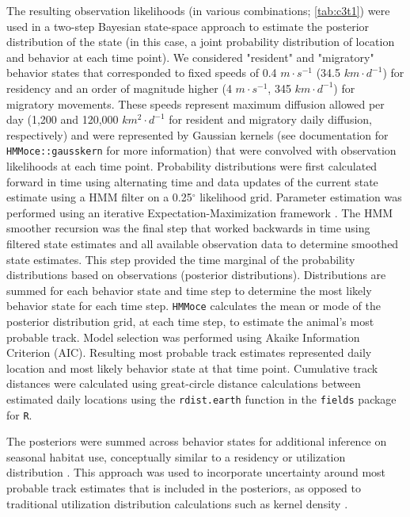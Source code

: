 The resulting observation likelihoods (in various combinations; \cref{tab:c3t1}) were used in a two-step Bayesian state-space approach to estimate the posterior distribution of the state (in this case, a joint probability distribution of location and behavior at each time point). We considered "resident" and "migratory" behavior states that corresponded to fixed speeds of 0.4 $m \cdot s^{-1}$ (34.5 $km  \cdot d^{-1}$) for residency \citep[following][]{Curtis2014} and an order of magnitude higher (4 $m \cdot s^{-1}$, 345 $km \cdot d^{-1}$) for migratory movements. These speeds represent maximum diffusion allowed per day (1,200 and 120,000 $km^2 \cdot d^{-1}$ for resident and migratory daily diffusion, respectively) and were represented by Gaussian kernels (see documentation for \texttt{HMMoce::gausskern} for more information) that were convolved with observation likelihoods at each time point. Probability distributions were first calculated forward in time using alternating time and data updates of the current state estimate using a HMM filter on a 0.25$^{\circ}$ likelihood grid. Parameter estimation was performed using an iterative Expectation-Maximization framework \citep{Woillez2016}. The HMM smoother recursion was the final step that worked backwards in time using filtered state estimates and all available observation data to determine smoothed state estimates. This step provided the time marginal of the probability distributions based on observations (posterior distributions). Distributions are summed for each behavior state and time step to determine the most likely behavior state for each time step. \texttt{HMMoce} calculates the mean or mode of the posterior distribution grid, at each time step, to estimate the animal's most probable track. Model selection was performed using Akaike Information Criterion (AIC). Resulting most probable track estimates represented daily location and most likely behavior state at that time point. Cumulative track distances were calculated using great-circle distance calculations between estimated daily locations using the \texttt{rdist.earth} function in the \texttt{fields} \citep{Nychka2015} package for \texttt{R}.

The posteriors were summed across behavior states for additional inference on seasonal habitat use, conceptually similar to a residency \citep[see Eq. 5, ][]{Pedersen2011a} or utilization distribution \citep{Royle2008}. This approach was used to incorporate uncertainty around most probable track estimates that is included in the posteriors, as opposed to traditional utilization distribution calculations such as kernel density \citep[\emph{e.g.}][]{Berumen2014}.

